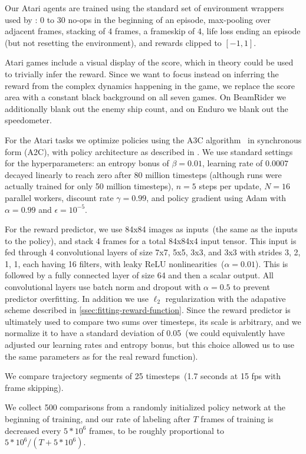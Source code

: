 \documentclass{article}
\begin{document}
Our Atari agents are trained
using the standard set of environment wrappers used by \citet{Mnih15}:
0 to 30 no-ops in the beginning of an episode,
max-pooling over adjacent frames, stacking of 4 frames,
a frameskip of 4, 
life loss ending an episode (but not resetting the environment), and
rewards clipped to $[-1, 1]$.

Atari games include a visual display of the score,
which in theory could be used to trivially infer the reward.
Since we want to focus instead on inferring the reward from the complex dynamics happening in the game,
we replace the score area with a constant black background on all seven games.
On BeamRider we additionally blank out the enemy ship count,
and on Enduro we blank out the speedometer. 

For the Atari tasks we optimize policies using the A3C algorithm~\citep{Mnih16} in synchronous form (A2C),
with policy architecture as described in \citet{Mnih15}.
We use standard settings for the hyperparameters:
an entropy bonus of $\beta=0.01$,
learning rate of $0.0007$ decayed linearly to reach zero after 80 million timesteps 
(although runs were actually trained for only 50 million timesteps),
$n=5$ steps per update, $N=16$ parallel workers,
discount rate $\gamma=0.99$,
and policy gradient using Adam with $\alpha=0.99$ and $\epsilon=10^{-5}$. 

For the reward predictor, we use 84x84 images as inputs~(the same as the inputs to the policy),
and stack 4 frames for a total 84x84x4 input tensor.
This input is fed through 4 convolutional layers of size 7x7, 5x5, 3x3, and 3x3 with strides 3, 2, 1, 1,
each having 16 filters, with leaky ReLU nonlinearities~($\alpha = 0.01$).
This is followed by a fully connected layer of size 64 and then a scalar output.
All convolutional layers use batch norm and dropout with $\alpha=0.5$ to prevent predictor overfitting.
In addition we use $\ell_2$ regularization with the adapative scheme described in \autoref{ssec:fitting-reward-function}.
Since the reward predictor is ultimately used to compare two sums over timesteps,
its scale is arbitrary, and we normalize it to have a standard deviation of 0.05~(we could equivalently have adjusted
our learning rates and entropy bonus, but this choice allowed us to use the same parameters as for the real reward function).

We compare trajectory segments of 25 timesteps~(1.7 seconds at 15 fps with frame skipping).

We collect 500 comparisons from a randomly initialized policy network at the beginning of training,
and our rate of labeling after $T$ frames
of training is decreased every $5*10^6$ frames, to be roughly proportional to $5*10^6 / (T+5*10^6)$.
\end{document}
